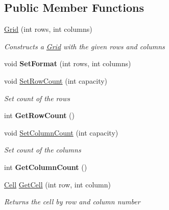 \subsection*{Public Member Functions}
\begin{DoxyCompactItemize}
\item 
\mbox{\hyperlink{class_space_v_i_l_1_1_grid_a43f2e279b402d3f37abaf7407cb10359}{Grid}} (int rows, int columns)
\begin{DoxyCompactList}\small\item\em Constructs a \mbox{\hyperlink{class_space_v_i_l_1_1_grid}{Grid}} with the given rows and columns \end{DoxyCompactList}\item 
\mbox{\label{class_space_v_i_l_1_1_grid_aec0c6b809ef355c95f2fbbd7608a8f2e}} 
void {\bfseries Set\+Format} (int rows, int columns)
\item 
void \mbox{\hyperlink{class_space_v_i_l_1_1_grid_a62b1f61a50a5cceefcee8c881f92e641}{Set\+Row\+Count}} (int capacity)
\begin{DoxyCompactList}\small\item\em Set count of the rows \end{DoxyCompactList}\item 
\mbox{\label{class_space_v_i_l_1_1_grid_a0306b68151d5d100ac90d298fcd67b6f}} 
int {\bfseries Get\+Row\+Count} ()
\item 
void \mbox{\hyperlink{class_space_v_i_l_1_1_grid_a601c091730701ac3e117396686c9904d}{Set\+Column\+Count}} (int capacity)
\begin{DoxyCompactList}\small\item\em Set count of the columns \end{DoxyCompactList}\item 
\mbox{\label{class_space_v_i_l_1_1_grid_a60c46214dcaaaf36ea21ebf29dcba72a}} 
int {\bfseries Get\+Column\+Count} ()
\item 
\mbox{\hyperlink{class_space_v_i_l_1_1_cell}{Cell}} \mbox{\hyperlink{class_space_v_i_l_1_1_grid_ad6866d757055ed488fac7ccceb62031c}{Get\+Cell}} (int row, int column)
\begin{DoxyCompactList}\small\item\em Returns the cell by row and column number \end{DoxyCompactList}\item 

\end{DoxyCompactItemize}
